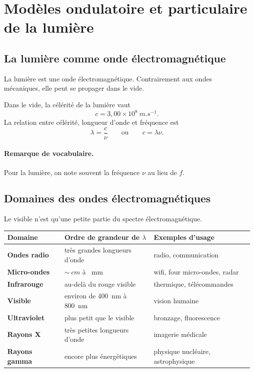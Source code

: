 \documentclass[11pt,a4paper]{article}
\begin{document}
\section{Modèles ondulatoire et particulaire de la lumière}

\subsection{La lumière comme onde électromagnétique}

\begin{definitionbox}
La lumière est une onde électromagnétique. Contrairement aux ondes mécaniques, elle peut se propager dans le vide.
\end{definitionbox}

\begin{propriete}
Dans le vide, la célérité de la lumière vaut
\[
c = 3{,}00\times 10^8\ \si{m.s^{-1}}.
\]
La relation entre célérité, longueur d'onde et fréquence est
\[
\lambda = \frac{c}{\nu}
\qquad \text{ou} \qquad c=\lambda\nu.
\]
\end{propriete}

\paragraph{Remarque de vocabulaire.}
Pour la lumière, on note souvent la fréquence $\nu$ au lieu de $f$.

\subsection{Domaines des ondes électromagnétiques}
Le visible n'est qu'une petite partie du spectre électromagnétique.

\begin{center}
\renewcommand{\arraystretch}{1.25}
\begin{tabularx}{\linewidth}{|>{\bfseries}m{4cm}|X|X|}
\hline
Domaine & Ordre de grandeur de $\lambda$ & Exemples d'usage \\
\hline
Ondes radio & très grandes longueurs d'onde & radio, communication \\
\hline
Micro-ondes & $\sim \SI{}{cm}$ à \SI{}{mm} & wifi, four micro-ondes, radar \\
\hline
Infrarouge & au-delà du rouge visible & thermique, télécommandes \\
\hline
Visible & environ de \SI{400}{nm} à \SI{800}{nm} & vision humaine \\
\hline
Ultraviolet & plus petit que le visible & bronzage, fluorescence \\
\hline
Rayons X & très petites longueurs d'onde & imagerie médicale \\
\hline
Rayons gamma & encore plus énergétiques & physique nucléaire, astrophysique \\
\hline
\end{tabularx}
\end{center}
\end{document}
